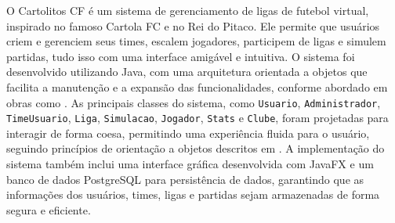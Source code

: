 \documentclass[12pt]{article}
\begin{document}
O Cartolitos CF é um sistema de gerenciamento de ligas de futebol virtual, inspirado no famoso Cartola FC e no Rei do Pitaco. Ele permite que usuários criem e gerenciem seus times, escalem jogadores, participem de ligas e simulem partidas, tudo isso com uma interface amigável e intuitiva.
O sistema foi desenvolvido utilizando Java, com uma arquitetura orientada a objetos que facilita a manutenção e a expansão das funcionalidades, conforme abordado em obras como \cite{weisfeld:2013,meyer:97,booch:2007}. As principais classes do sistema, como \texttt{Usuario}, \texttt{Administrador}, \texttt{TimeUsuario}, \texttt{Liga}, \texttt{Simulacao}, \texttt{Jogador}, \texttt{Stats} e \texttt{Clube}, foram projetadas para interagir de forma coesa, permitindo uma experiência fluida para o usuário, seguindo princípios de orientação a objetos descritos em \cite{horstmann-cornell:2012,horstmann-cornell:2013}.
A implementação do sistema também inclui uma interface gráfica desenvolvida com JavaFX e um banco de dados PostgreSQL para persistência de dados, garantindo que as informações dos usuários, times, ligas e partidas sejam armazenadas de forma segura e eficiente.


\end{document}
